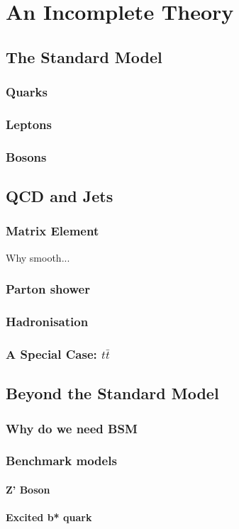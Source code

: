 \chapter{An Incomplete Theory}
\label{sec:theory}

\section{The Standard Model}
  \subsection{Quarks}
  \subsection{Leptons}
  \subsection{Bosons}

  \section{QCD and Jets}
  
  \subsection{Matrix Element}
  Why smooth...
  \subsection{Parton shower}
  \subsection{Hadronisation}
  \subsection{A Special Case: $t\bar{t}$}

\section{Beyond the Standard Model}
  \subsection{Why do we need BSM}
  \subsection{Benchmark models}
  \subsubsection{Z' Boson}
  \subsubsection{Excited b* quark}
